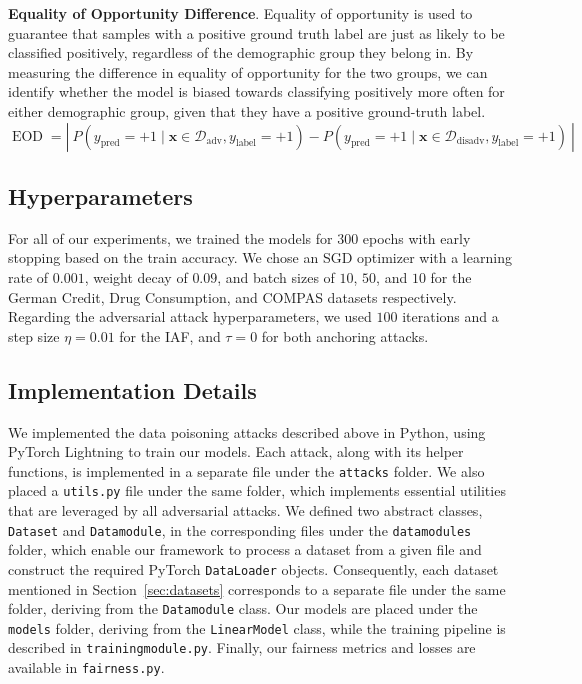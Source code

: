 \textbf{Equality of Opportunity Difference}. Equality of opportunity is used to guarantee that samples with a positive ground truth label are just as likely to be classified positively, regardless of the demographic group they belong in. By measuring the difference in equality of opportunity for the two groups, we can identify whether the model is biased towards classifying positively more often for either demographic group, given that they have a positive ground-truth label.
\begin{equation*}
    \operatorname{EOD} =
    \left|~P(y_{\text{pred}} = +1 \mid \mathbf{x} \in \mathcal{D}_\text{adv}, y_{\text{label}} = +1)
    - P(y_{\text{pred}} = +1 \mid \mathbf{x} \in \mathcal{D}_\text{disadv}, y_{\text{label}} = +1)~\right|
\end{equation*}

\subsection{Hyperparameters}
For all of our experiments, we trained the models for $300$ epochs with early stopping based on the train accuracy. We chose an SGD optimizer with a learning rate of $0.001$, weight decay of $0.09$, and batch sizes of $10$, $50$, and $10$ for the German Credit, Drug Consumption, and COMPAS datasets respectively. Regarding the adversarial attack hyperparameters, we used $100$ iterations and a step size $\eta=0.01$ for the IAF, and $\tau=0$ for both anchoring attacks.

\subsection{Implementation Details}
We implemented the data poisoning attacks described above in Python, using PyTorch Lightning to train our models\footnotemark. Each attack, along with its helper functions, is implemented in a separate file under the \texttt{attacks} folder. We also placed a \texttt{utils.py} file under the same folder, which implements essential utilities that are leveraged by all adversarial attacks.
We defined two abstract classes, \texttt{Dataset} and \texttt{Datamodule}, in the corresponding files under the \texttt{datamodules} folder, which enable our framework to process a dataset from a given file and construct the required PyTorch \texttt{DataLoader} objects. Consequently, each dataset mentioned in Section~\ref{sec:datasets} corresponds to a separate file under the same folder, deriving from the \texttt{Datamodule} class. Our models are placed under the \texttt{models} folder, deriving from the \texttt{LinearModel} class, while the training pipeline is described in \texttt{trainingmodule.py}. Finally, our fairness metrics and losses are available in \texttt{fairness.py}.

